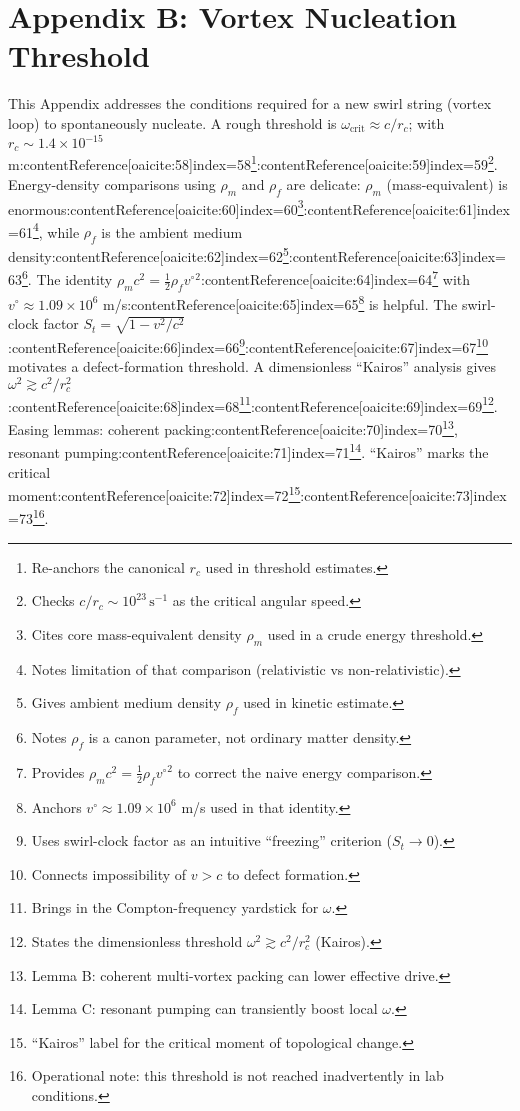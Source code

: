 \documentclass[12pt]{article}
\begin{document}
\section*{Appendix B: Vortex Nucleation Threshold}\label{app:Threshold}
    This Appendix addresses the conditions required for a new swirl string (vortex loop) to spontaneously nucleate. A rough threshold is $\omega_{\text{crit}}\approx c/r_c$; with $r_c \sim 1.4\times10^{-15}$ m:contentReference[oaicite:58]{index=58}\footnote{Re-anchors the canonical $r_c$ used in threshold estimates.}:contentReference[oaicite:59]{index=59}\footnote{Checks $c/r_c\sim10^{23}\,\mathrm{s^{-1}}$ as the critical angular speed.}. Energy-density comparisons using $\rho_m$ and $\rho_f$ are delicate: $\rho_m$ (mass-equivalent) is enormous:contentReference[oaicite:60]{index=60}\footnote{Cites core mass-equivalent density $\rho_m$ used in a crude energy threshold.}:contentReference[oaicite:61]{index=61}\footnote{Notes limitation of that comparison (relativistic vs non-relativistic).}, while $\rho_f$ is the ambient medium density:contentReference[oaicite:62]{index=62}\footnote{Gives ambient medium density $\rho_f$ used in kinetic estimate.}:contentReference[oaicite:63]{index=63}\footnote{Notes $\rho_f$ is a canon parameter, not ordinary matter density.}. The identity $\rho_m c^2=\tfrac12\rho_f {v^\circ}^2$:contentReference[oaicite:64]{index=64}\footnote{Provides $\rho_m c^2=\frac12\rho_f {v^\circ}^2$ to correct the naive energy comparison.} with $v^\circ\approx1.09\times10^6$ m/s:contentReference[oaicite:65]{index=65}\footnote{Anchors $v^\circ\approx 1.09\times10^6$ m/s used in that identity.} is helpful. The swirl-clock factor $S_t=\sqrt{1-v^2/c^2}$:contentReference[oaicite:66]{index=66}\footnote{Uses swirl-clock factor as an intuitive ``freezing'' criterion ($S_t\to 0$).}:contentReference[oaicite:67]{index=67}\footnote{Connects impossibility of $v>c$ to defect formation.} motivates a defect-formation threshold. A dimensionless “Kairos” analysis gives $\omega^2\gtrsim c^2/r_c^2$:contentReference[oaicite:68]{index=68}\footnote{Brings in the Compton-frequency yardstick for $\omega$.}:contentReference[oaicite:69]{index=69}\footnote{States the dimensionless threshold $\omega^2\gtrsim c^2/r_c^2$ (Kairos).}. Easing lemmas: coherent packing:contentReference[oaicite:70]{index=70}\footnote{Lemma B: coherent multi-vortex packing can lower effective drive.}, resonant pumping:contentReference[oaicite:71]{index=71}\footnote{Lemma C: resonant pumping can transiently boost local $\omega$.}. ``Kairos'' marks the critical moment:contentReference[oaicite:72]{index=72}\footnote{``Kairos'' label for the critical moment of topological change.}:contentReference[oaicite:73]{index=73}\footnote{Operational note: this threshold is not reached inadvertently in lab conditions.}.
\end{document}
